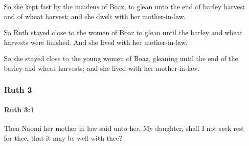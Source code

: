 			\begin{versebox}
					\item[BHS] 
					\item[LXX] 
					\item[ASV] So she kept fast by the maidens of Boaz, to glean unto the end of barley harvest and of wheat harvest; and she dwelt with her mother-in-law.
					\item[NIV] So Ruth stayed close to the women of Boaz to glean until the barley and wheat harvests were finished. And she lived with her mother-in-law.
					\item[NRSV] So she stayed close to the young women of Boaz, gleaning until the end of the barley and wheat harvests; and she lived with her mother-in-law.
			\end{versebox}
	\subsubsection{Ruth 3} %
		\label{RUTH-3}

		\paragraph{Ruth 3:1} %
			\label{RUTH-3-1}

			Then Naomi her mother in law said unto her, My daughter, shall I not seek rest for thee, that it may be well with thee?

